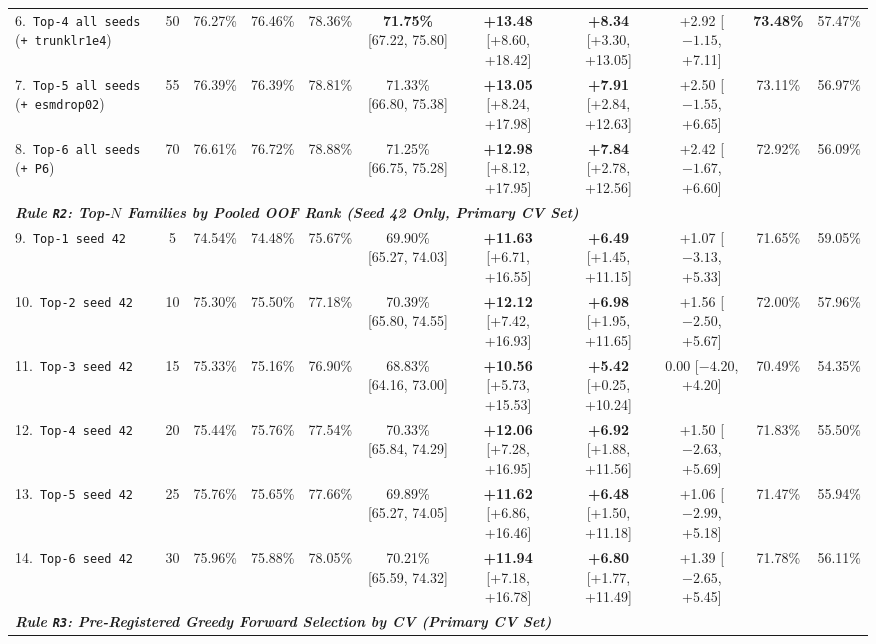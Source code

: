\documentclass[10pt,a4paper,twocolumn]{article}
\begin{document}
\begin{table}[t!]
\begin{tabular}{lcccccccccc}
    6.\ \texttt{Top-4 all seeds} (\texttt{+ trunklr1e4}) & 50 & 76.27\% & 76.46\% & 78.36\% & \textbf{71.75\%} [67.22, 75.80] & \textbf{+13.48} [+8.60, +18.42] & \textbf{+8.34} [+3.30, +13.05] & +2.92 [$-1.15$, +7.11] & \textbf{73.48\%} & 57.47\% \\
    7.\ \texttt{Top-5 all seeds} (\texttt{+ esmdrop02}) & 55 & 76.39\% & 76.39\% & 78.81\% & 71.33\% [66.80, 75.38] & \textbf{+13.05} [+8.24, +17.98] & \textbf{+7.91} [+2.84, +12.63] & +2.50 [$-1.55$, +6.65] & 73.11\% & 56.97\% \\
    8.\ \texttt{Top-6 all seeds} (\texttt{+ P6}) & 70 & 76.61\% & 76.72\% & 78.88\% & 71.25\% [66.75, 75.28] & \textbf{+12.98} [+8.12, +17.95] & \textbf{+7.84} [+2.78, +12.56] & +2.42 [$-1.67$, +6.60] & 72.92\% & 56.09\% \\
    \midrule
    \multicolumn{11}{l}{\textit{\textbf{Rule \texttt{R2}: Top-$N$ Families by Pooled OOF Rank (Seed 42 Only, Primary CV Set)}}} \\
    9.\ \texttt{Top-1 seed 42} & 5 & 74.54\% & 74.48\% & 75.67\% & 69.90\% [65.27, 74.03] & \textbf{+11.63} [+6.71, +16.55] & \textbf{+6.49} [+1.45, +11.15] & +1.07 [$-3.13$, +5.33] & 71.65\% & 59.05\% \\
    10.\ \texttt{Top-2 seed 42} & 10 & 75.30\% & 75.50\% & 77.18\% & 70.39\% [65.80, 74.55] & \textbf{+12.12} [+7.42, +16.93] & \textbf{+6.98} [+1.95, +11.65] & +1.56 [$-2.50$, +5.67] & 72.00\% & 57.96\% \\
    11.\ \texttt{Top-3 seed 42} & 15 & 75.33\% & 75.16\% & 76.90\% & 68.83\% [64.16, 73.00] & \textbf{+10.56} [+5.73, +15.53] & \textbf{+5.42} [+0.25, +10.24] & 0.00 [$-4.20$, +4.20] & 70.49\% & 54.35\% \\
    12.\ \texttt{Top-4 seed 42} & 20 & 75.44\% & 75.76\% & 77.54\% & 70.33\% [65.84, 74.29] & \textbf{+12.06} [+7.28, +16.95] & \textbf{+6.92} [+1.88, +11.56] & +1.50 [$-2.63$, +5.69] & 71.83\% & 55.50\% \\
    13.\ \texttt{Top-5 seed 42} & 25 & 75.76\% & 75.65\% & 77.66\% & 69.89\% [65.27, 74.05] & \textbf{+11.62} [+6.86, +16.46] & \textbf{+6.48} [+1.50, +11.18] & +1.06 [$-2.99$, +5.18] & 71.47\% & 55.94\% \\
    14.\ \texttt{Top-6 seed 42} & 30 & 75.96\% & 75.88\% & 78.05\% & 70.21\% [65.59, 74.32] & \textbf{+11.94} [+7.18, +16.78] & \textbf{+6.80} [+1.77, +11.49] & +1.39 [$-2.65$, +5.45] & 71.78\% & 56.11\% \\
    \midrule
    \multicolumn{11}{l}{\textit{\textbf{Rule \texttt{R3}: Pre-Registered Greedy Forward Selection by CV (Primary CV Set)}}} \\

\end{tabular}
\end{table}
\end{document}
